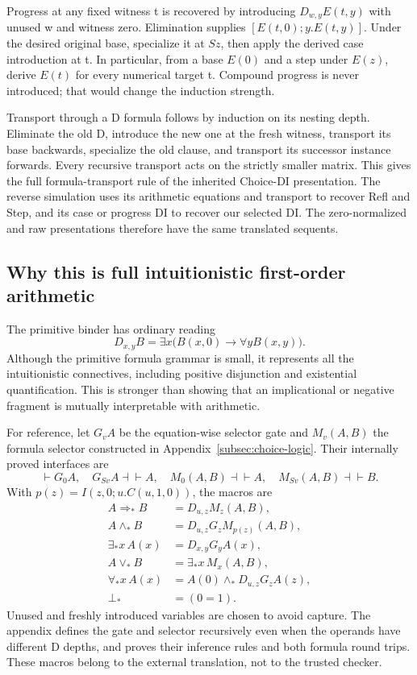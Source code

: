 \documentclass[11pt,letterpaper]{article}
\theoremstyle{definition}
\begin{document}
Progress at any fixed witness t is recovered by introducing
\(D_{w,y}E(t,y)\) with unused w and witness zero. Elimination supplies
\([E(t,0);y.E(t,y)]\). Under the desired original base, specialize it
at \(Sz\), then apply the derived case introduction at t. In
particular, from a base \(E(0)\) and a step under \(E(z)\), derive
\(E(t)\) for every numerical target t. Compound progress is never
introduced; that would change the induction strength.

Transport through a D formula follows by induction on its nesting
depth. Eliminate the old D, introduce the new one at the fresh witness,
transport its base backwards, specialize the old clause, and transport
its successor instance forwards. Every recursive transport acts on the
strictly smaller matrix. This gives the full formula-transport rule of
the inherited Choice-DI presentation. The reverse simulation uses its
arithmetic equations and transport to recover Refl and Step, and its
case or progress DI to recover our selected DI. The zero-normalized
and raw presentations therefore have the same translated sequents.

\subsection{Why this is full intuitionistic first-order arithmetic}

The primitive binder has ordinary reading
\[
 D_{x,y}B=\exists x\bigl(B(x,0)\to\forall y B(x,y)\bigr).
\]
Although the primitive formula grammar is small, it represents all the
intuitionistic connectives, including positive disjunction and existential
quantification. This is stronger than showing that an implicational or
negative fragment is mutually interpretable with arithmetic.

For reference, let \(G_vA\) be the equation-wise selector gate and
\(M_v(A,B)\) the formula selector constructed in
Appendix~\ref{subsec:choice-logic}. Their internally proved interfaces are
\[
 \vdash G_0A,\quad G_{Sv}A\dashv\vdash A,\quad
 M_0(A,B)\dashv\vdash A,\quad M_{Sv}(A,B)\dashv\vdash B.
\]
With \(p(z)=I(z,0;u.C(u,1,0))\), the macros are
\begin{align*}
 A\Rightarrow_*B&=D_{u,z}M_z(A,B),\\
 A\wedge_*B&=D_{u,z}G_zM_{p(z)}(A,B),\\
 \exists_*x\,A(x)&=D_{x,y}G_yA(x),\\
 A\vee_*B&=\exists_*x\,M_x(A,B),\\
 \forall_*x\,A(x)&=A(0)\wedge_*D_{u,z}G_zA(z),\\
 \bot_*&=(0=1).
\end{align*}
Unused and freshly introduced variables are chosen to avoid capture.
The appendix defines the gate and selector recursively even when the
operands have different D depths, and proves their inference rules and
both formula round trips. These macros belong to the external
translation, not to the trusted checker.
\end{document}
